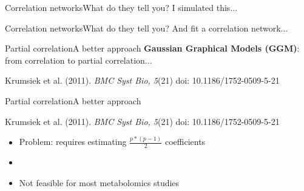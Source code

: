 \documentclass[xcolor=dvipsnames]{beamer}
\begin{document}
\begin{frame}{Correlation networks}{What do they tell you?}
	{I simulated this...}
	\begin{center}
	\end{center}
\end{frame}

\begin{frame}{Correlation networks}{What do they tell you?}
	{And fit a correlation network...}
	\begin{center}
	\end{center}
\end{frame}

\begin{frame}{Partial correlation}{A better approach}
	\vspace{-15.5pt}
	{\Large \textbf{Gaussian Graphical Models (GGM)}: from correlation to partial correlation...}
	
	\begin{center}
		Krumsiek et al. (2011). \emph{BMC Syst Bio, 5}(21) doi: 10.1186/1752-0509-5-21
	\end{center}
\end{frame}

\begin{frame}{Partial correlation}{A better approach}
	\vspace{-15.5pt}
	\begin{center}
		Krumsiek et al. (2011). \emph{BMC Syst Bio, 5}(21) doi: 10.1186/1752-0509-5-21
	\end{center}
	\begin{itemize}
		\item Problem: requires estimating $\frac{p*(p-1)}{2}$ coefficients
		\item[]
		\item Not feasible for most metabolomics studies 
	\end{itemize}
\end{frame}
\end{document}
